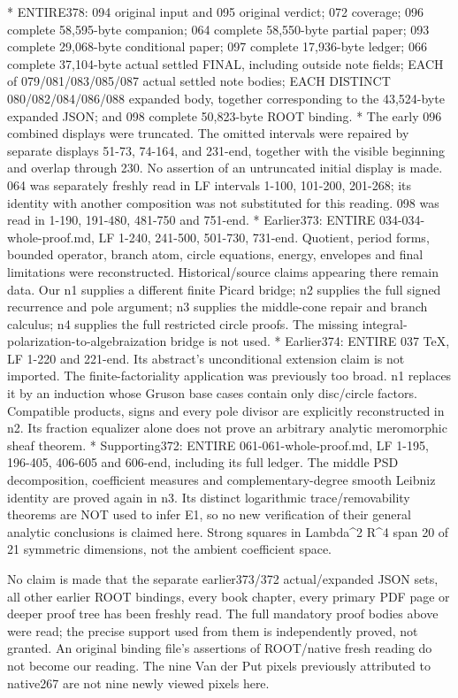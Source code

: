 \documentclass[11pt]{article}
\begin{document}
* ENTIRE378: 094 original input and 095 original verdict; 072 coverage; 096 complete 58,595-byte companion; 064 complete 58,550-byte partial paper; 093 complete 29,068-byte conditional paper; 097 complete 17,936-byte ledger; 066 complete 37,104-byte actual settled FINAL, including outside note fields; EACH of 079/081/083/085/087 actual settled note bodies; EACH DISTINCT 080/082/084/086/088 expanded body, together corresponding to the 43,524-byte expanded JSON; and 098 complete 50,823-byte ROOT binding.
* The early 096 combined displays were truncated. The omitted intervals were repaired by separate displays 51-73, 74-164, and 231-end, together with the visible beginning and overlap through 230. No assertion of an untruncated initial display is made. 064 was separately freshly read in LF intervals 1-100, 101-200, 201-268; its identity with another composition was not substituted for this reading. 098 was read in 1-190, 191-480, 481-750 and 751-end.
* Earlier373: ENTIRE 034-034-whole-proof.md, LF 1-240, 241-500, 501-730, 731-end. Quotient, period forms, bounded operator, branch atom, circle equations, energy, envelopes and final limitations were reconstructed. Historical/source claims appearing there remain data. Our n1 supplies a different finite Picard bridge; n2 supplies the full signed recurrence and pole argument; n3 supplies the middle-cone repair and branch calculus; n4 supplies the full restricted circle proofs. The missing integral-polarization-to-algebraization bridge is not used.
* Earlier374: ENTIRE 037 TeX, LF 1-220 and 221-end. Its abstract's unconditional extension claim is not imported. The finite-factoriality application was previously too broad. n1 replaces it by an induction whose Gruson base cases contain only disc/circle factors. Compatible products, signs and every pole divisor are explicitly reconstructed in n2. Its fraction equalizer alone does not prove an arbitrary analytic meromorphic sheaf theorem.
* Supporting372: ENTIRE 061-061-whole-proof.md, LF 1-195, 196-405, 406-605 and 606-end, including its full ledger. The middle PSD decomposition, coefficient measures and complementary-degree smooth Leibniz identity are proved again in n3. Its distinct logarithmic trace/removability theorems are NOT used to infer E1, so no new verification of their general analytic conclusions is claimed here. Strong squares in Lambda\textasciicircum{}2 R\textasciicircum{}4 span 20 of 21 symmetric dimensions, not the ambient coefficient space.

No claim is made that the separate earlier373/372 actual/expanded JSON sets, all other earlier ROOT bindings, every book chapter, every primary PDF page or deeper proof tree has been freshly read. The full mandatory proof bodies above were read; the precise support used from them is independently proved, not granted. An original binding file's assertions of ROOT/native fresh reading do not become our reading. The nine Van der Put pixels previously attributed to native267 are not nine newly viewed pixels here.
\end{document}
